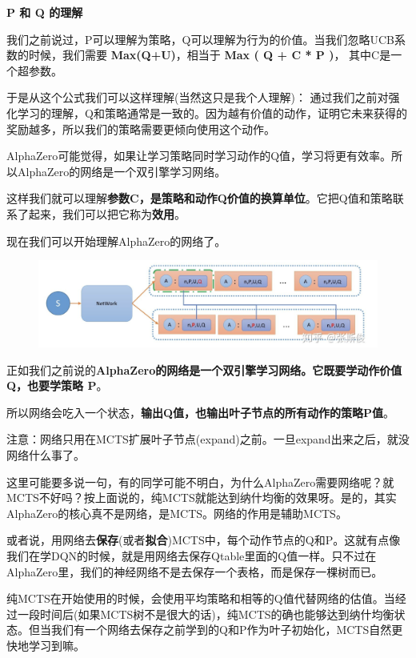 \documentclass[12pt]{article}
\begin{document}
\begin{framed}
\textbf{P 和 Q 的理解}

我们之前说过，P可以理解为策略，Q可以理解为行为的价值。当我们忽略UCB系数的时候，我们需要 \textbf{Max(Q+U)}，相当于 \textbf{Max ( Q + C * P )}， 其中C是一个超参数。

于是从这个公式我们可以这样理解(当然这只是我个人理解)：
通过我们之前对强化学习的理解，Q和策略通常是一致的。因为越有价值的动作，证明它未来获得的奖励越多，所以我们的策略需要更倾向使用这个动作。

AlphaZero可能觉得，如果让学习策略同时学习动作的Q值，学习将更有效率。所以AlphaZero的网络是一个双引擎学习网络。

这样我们就可以理解\textbf{参数C，是策略和动作Q价值的换算单位}。它把Q值和策略联系了起来，我们可以把它称为\textbf{效用}。

现在我们可以开始理解AlphaZero的网络了。
\begin{figure}[H]
    \centering
    \includegraphics[width=.8\textwidth]{fig/ReinforcementLearning/AlphaZero_MCTS_Eq_3.png}
\end{figure}

正如我们之前说的\textbf{AlphaZero的网络是一个双引擎学习网络。它既要学动作价值Q，也要学策略 P}。

所以网络会吃入一个状态，\textbf{输出Q值，也输出叶子节点的所有动作的策略P值}。

注意：网络只用在MCTS扩展叶子节点(expand)之前。一旦expand出来之后，就没网络什么事了。

这里可能要多说一句，有的同学可能不明白，为什么AlphaZero需要网络呢？就MCTS不好吗？按上面说的，纯MCTS就能达到纳什均衡的效果呀。是的，其实AlphaZero的核心真不是网络，是MCTS。网络的作用是辅助MCTS。

或者说，用网络去\textbf{保存}(或者\textbf{拟合})MCTS中，每个动作节点的Q和P。这就有点像我们在学DQN的时候，就是用网络去保存Qtable里面的Q值一样。只不过在AlphaZero里，我们的神经网络不是去保存一个表格，而是保存一棵树而已。

纯MCTS在开始使用的时候，会使用平均策略和相等的Q值代替网络的估值。当经过一段时间后(如果MCTS树不是很大的话)，纯MCTS的确也能够达到纳什均衡状态。但当我们有一个网络去保存之前学到的Q和P作为叶子初始化，MCTS自然更快地学习到嘛。


\end{framed}
\end{document}
